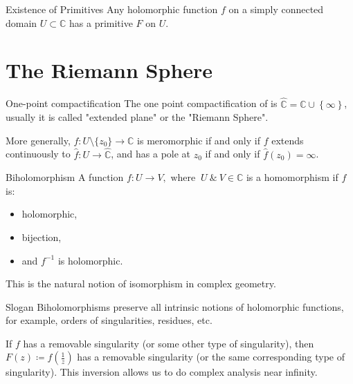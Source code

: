 \documentclass{article}
\begin{document}
                        \begin{thrm}{Existence of Primitives}{}
                        Any holomorphic function \( f \) on a simply connected domain \( U \subset \mathbb{C}  \) has a primitive \( F \) on \( U \). 
                        \end{thrm}
\section{The Riemann Sphere}

\begin{defn}{One-point compactification}{}
    The one point compactification of \C{} is     
\( \hat{\mathbb{C}}  = \mathbb{C} \cup \left\{ \infty  \right\}   \), usually it is called "extended \C{} plane" or the "Riemann Sphere".
\end{defn}

\begin{rmk}{}{}
More generally, \( f: U \setminus \{z_0\}\to \mathbb{C}  \) is meromorphic if and only if \(f  \) extends continuously to \( \hat{f} : U \to  \widehat{\mathbb{C}}  \), and has a pole at \( z_0 \) if and only if \( \hat{f} (z_0) = \infty  \).  
\end{rmk}


\begin{defn}{Biholomorphism}{}
A function \( f: U \to V, \text{ where }  \  U \ \& \ V \in \mathbb{C}  \) is a homomorphism if \( f \) is:
\begin{itemize}
    \item holomorphic,
    \item bijection,
    \item and \( f^{-1}  \) is holomorphic.
\end{itemize}
This is the natural notion of isomorphism in complex geometry.  
\end{defn}
\begin{misc}{Slogan}{}
Biholomorphisms preserve all intrinsic notions of holomorphic functions, for example, orders of singularities, residues, etc. 
\end{misc}

\begin{defn}{}{}
If \( f \) has a removable singularity (or some other type of singularity), then \( F(z)\coloneqq f(\frac{1}{z}) \) has a removable singularity (or the same corresponding type of singularity). This inversion allows us to do complex analysis near infinity.  
\end{defn}
\end{document}
